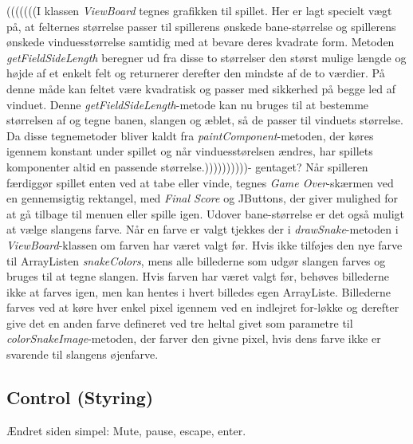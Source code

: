\documentclass{report}
\begin{document}
(((((((I klassen \textit{ViewBoard} tegnes grafikken til spillet. Her er lagt specielt vægt på, at felternes størrelse passer til spillerens ønskede bane-størrelse og spillerens ønskede vinduesstørrelse samtidig med at bevare deres kvadrate form. Metoden \textit{getFieldSideLength} beregner ud fra disse to størrelser den størst mulige længde og højde af et enkelt felt og returnerer derefter den mindste af de to værdier. På denne måde kan feltet være kvadratisk og passer med sikkerhed på begge led af vinduet. Denne \textit{getFieldSideLength}-metode kan nu bruges til at bestemme størrelsen af og tegne banen, slangen og æblet, så de passer til vinduets størrelse. Da disse tegnemetoder bliver kaldt fra \textit{paintComponent}-metoden, der køres igennem konstant under spillet og når vinduesstørelsen ændres, har spillets komponenter altid en passende størrelse.))))))))))- gentaget?
Når spilleren færdiggør spillet enten ved at tabe eller vinde, tegnes \textit{Game Over}-skærmen ved en gennemsigtig rektangel, med \textit{Final Score} og JButtons, der giver mulighed for at gå tilbage til menuen eller spille igen.
Udover bane-størrelse er det også muligt at vælge slangens farve. Når en farve er valgt tjekkes der i \textit{drawSnake}-metoden i \textit{ViewBoard}-klassen om farven har været valgt før. Hvis ikke tilføjes den nye farve til ArrayListen \textit{snakeColors}, mens alle billederne som udgør slangen farves og bruges til at tegne slangen. Hvis farven har været valgt før, behøves billederne ikke at farves igen, men kan hentes i hvert billedes egen ArrayListe. Billederne farves ved at køre hver enkel pixel igennem ved en indlejret for-løkke og derefter give det en anden farve defineret ved tre heltal givet som parametre til \textit{colorSnakeImage}-metoden, der farver den givne pixel, hvis dens farve ikke er svarende til slangens øjenfarve.

\subsection{Control (Styring)}
Ændret siden simpel: Mute, pause, escape, enter.
\end{document}
